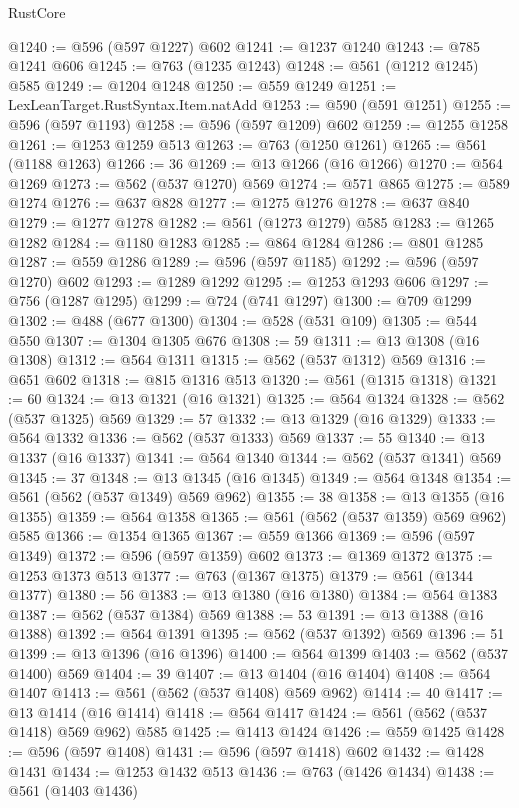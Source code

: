\begin{lexlean}{RustCore}
\begin{coremodule}
@1240 := @596 (@597 @1227) @602
@1241 := @1237 @1240
@1243 := @785 @1241 @606
@1245 := @763 (@1235 @1243)
@1248 := @561 (@1212 @1245) @585
@1249 := @1204 @1248
@1250 := @559 @1249
@1251 := LexLeanTarget.RustSyntax.Item.natAdd
@1253 := @590 (@591 @1251)
@1255 := @596 (@597 @1193)
@1258 := @596 (@597 @1209) @602
@1259 := @1255 @1258
@1261 := @1253 @1259 @513
@1263 := @763 (@1250 @1261)
@1265 := @561 (@1188 @1263)
@1266 := 36
@1269 := @13 @1266 (@16 @1266)
@1270 := @564 @1269
@1273 := @562 (@537 @1270) @569
@1274 := @571 @865
@1275 := @589 @1274
@1276 := @637 @828
@1277 := @1275 @1276
@1278 := @637 @840
@1279 := @1277 @1278
@1282 := @561 (@1273 @1279) @585
@1283 := @1265 @1282
@1284 := @1180 @1283
@1285 := @864 @1284
@1286 := @801 @1285
@1287 := @559 @1286
@1289 := @596 (@597 @1185)
@1292 := @596 (@597 @1270) @602
@1293 := @1289 @1292
@1295 := @1253 @1293 @606
@1297 := @756 (@1287 @1295)
@1299 := @724 (@741 @1297)
@1300 := @709 @1299
@1302 := @488 (@677 @1300)
@1304 := @528 (@531 @109)
@1305 := @544 @550
@1307 := @1304 @1305 @676
@1308 := 59
@1311 := @13 @1308 (@16 @1308)
@1312 := @564 @1311
@1315 := @562 (@537 @1312) @569
@1316 := @651 @602
@1318 := @815 @1316 @513
@1320 := @561 (@1315 @1318)
@1321 := 60
@1324 := @13 @1321 (@16 @1321)
@1325 := @564 @1324
@1328 := @562 (@537 @1325) @569
@1329 := 57
@1332 := @13 @1329 (@16 @1329)
@1333 := @564 @1332
@1336 := @562 (@537 @1333) @569
@1337 := 55
@1340 := @13 @1337 (@16 @1337)
@1341 := @564 @1340
@1344 := @562 (@537 @1341) @569
@1345 := 37
@1348 := @13 @1345 (@16 @1345)
@1349 := @564 @1348
@1354 := @561 (@562 (@537 @1349) @569 @962)
@1355 := 38
@1358 := @13 @1355 (@16 @1355)
@1359 := @564 @1358
@1365 := @561 (@562 (@537 @1359) @569 @962) @585
@1366 := @1354 @1365
@1367 := @559 @1366
@1369 := @596 (@597 @1349)
@1372 := @596 (@597 @1359) @602
@1373 := @1369 @1372
@1375 := @1253 @1373 @513
@1377 := @763 (@1367 @1375)
@1379 := @561 (@1344 @1377)
@1380 := 56
@1383 := @13 @1380 (@16 @1380)
@1384 := @564 @1383
@1387 := @562 (@537 @1384) @569
@1388 := 53
@1391 := @13 @1388 (@16 @1388)
@1392 := @564 @1391
@1395 := @562 (@537 @1392) @569
@1396 := 51
@1399 := @13 @1396 (@16 @1396)
@1400 := @564 @1399
@1403 := @562 (@537 @1400) @569
@1404 := 39
@1407 := @13 @1404 (@16 @1404)
@1408 := @564 @1407
@1413 := @561 (@562 (@537 @1408) @569 @962)
@1414 := 40
@1417 := @13 @1414 (@16 @1414)
@1418 := @564 @1417
@1424 := @561 (@562 (@537 @1418) @569 @962) @585
@1425 := @1413 @1424
@1426 := @559 @1425
@1428 := @596 (@597 @1408)
@1431 := @596 (@597 @1418) @602
@1432 := @1428 @1431
@1434 := @1253 @1432 @513
@1436 := @763 (@1426 @1434)
@1438 := @561 (@1403 @1436)

\end{coremodule}
\end{lexlean}
